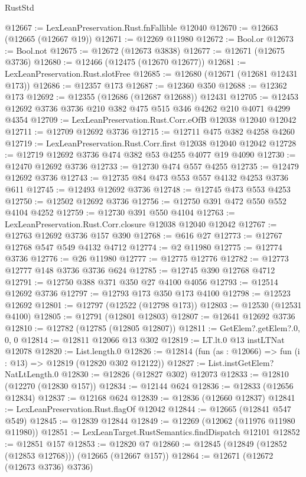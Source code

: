 \begin{lexlean}{RustStd}
\begin{coremodule}
@12667 := LexLeanPreservation.Rust.fnFallible @12040
@12670 := @12663 (@12665 (@12667 @19))
@12671 := @12269 @11980
@12672 := Bool.or
@12673 := Bool.not
@12675 := @12672 (@12673 @3838)
@12677 := @12671 (@12675 @3736)
@12680 := @12466 (@12475 (@12670 @12677))
@12681 := LexLeanPreservation.Rust.slotFree
@12685 := @12680 (@12671 (@12681 @12431 @173))
@12686 := @12357 @173
@12687 := @12360 @350
@12688 := @12362 @173
@12692 := @12355 (@12686 (@12687 @12688)) @12431
@12705 := @12453 @12692 @3736 @3736 @210 @382 @475 @515 @346 @4262 @210 @4071 @4299 @4354
@12709 := LexLeanPreservation.Rust.Corr.eOfB @12038 @12040 @12042
@12711 := @12709 @12692 @3736
@12715 := @12711 @475 @382 @4258 @4260
@12719 := LexLeanPreservation.Rust.Corr.first @12038 @12040 @12042
@12728 := @12719 @12692 @3736 @474 @382 @53 @4255 @4077 @19 @4090
@12730 := @12470 @12692 @3736
@12733 := @12730 @474 @557 @4255
@12735 := @12479 @12692 @3736
@12743 := @12735 @84 @473 @553 @557 @4132 @4253 @3736 @611
@12745 := @12493 @12692 @3736
@12748 := @12745 @473 @553 @4253
@12750 := @12502 @12692 @3736
@12756 := @12750 @391 @472 @550 @552 @4104 @4252
@12759 := @12730 @391 @550 @4104
@12763 := LexLeanPreservation.Rust.Corr.closure @12038 @12040 @12042
@12767 := @12763 @12692 @3736 @157 @390
@12768 := @616 @27
@12773 := @12767 @12768 @547 @549 @4132 @4712
@12774 := @2 @11980
@12775 := @12774 @3736
@12776 := @26 @11980
@12777 := @12775 @12776
@12782 := @12773 @12777 @148 @3736 @3736 @624
@12785 := @12745 @390 @12768 @4712
@12791 := @12750 @388 @371 @350 @27 @4100 @4056
@12793 := @12514 @12692 @3736
@12797 := @12793 @173 @350 @173 @4100
@12798 := @12523 @12692
@12801 := @12797 (@12522 (@12798 @173))
@12803 := @12530 (@12531 @4100)
@12805 := @12791 (@12801 @12803)
@12807 := @12641 @12692 @3736
@12810 := @12782 (@12785 (@12805 @12807))
@12811 := GetElem?.getElem?.{0, 0, 0}
@12814 := @12811 @12066 @13 @302
@12819 := LT.lt.{0} @13 instLTNat @12078
@12820 := List.length.{0}
@12826 := @12814 (fun (as : @12066) => fun (i : @13) => @12819 (@12820 @302 @12122))
@12827 := List.instGetElem?NatLtLength.{0}
@12830 := @12826 (@12827 @302) @12073
@12833 := @12810 (@12270 (@12830 @157))
@12834 := @12144 @624
@12836 := @12833 (@12656 @12834)
@12837 := @12168 @624
@12839 := @12836 (@12660 @12837)
@12841 := LexLeanPreservation.Rust.flagOf @12042
@12844 := @12665 (@12841 @547 @549)
@12845 := @12839 @12844
@12849 := @12269 (@12062 (@11976 @11980 @11980))
@12851 := LexLeanTarget.RustSemantics.findDispatch @12101
@12852 := @12851 @157
@12853 := @12820 @7
@12860 := @12845 (@12849 (@12852 (@12853 @12768))) (@12665 (@12667 @157))
@12864 := @12671 (@12672 (@12673 @3736) @3736)

\end{coremodule}
\end{lexlean}
